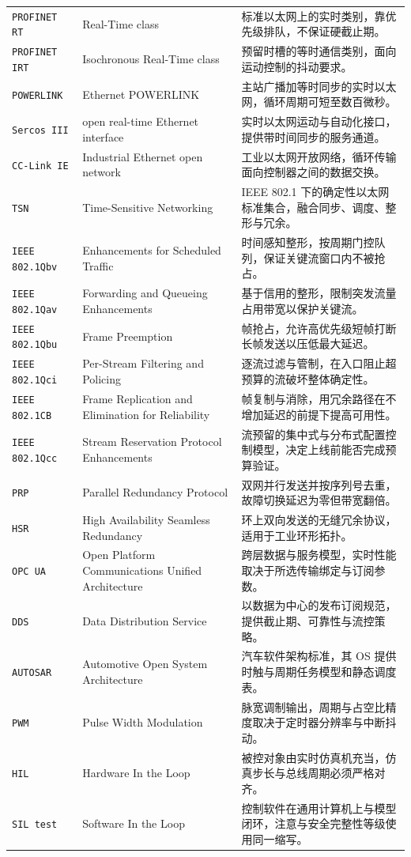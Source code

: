 \documentclass[12pt,a4paper,fontset=fandol]{ctexbook}
\newcommand{\Tp}[1]{\texttt{#1}}
\begin{document}
\begin{longtable}{@{} >{\raggedright\arraybackslash}p{} >{\raggedright\arraybackslash}p{} >{\raggedright\arraybackslash}p{}@{}}
\Tp{PROFINET RT} & Real-Time class & 标准以太网上的实时类别，靠优先级排队，不保证硬截止期。 \\
\Tp{PROFINET IRT} & Isochronous Real-Time class & 预留时槽的等时通信类别，面向运动控制的抖动要求。 \\
\Tp{POWERLINK} & Ethernet POWERLINK & 主站广播加等时同步的实时以太网，循环周期可短至数百微秒。 \\
\Tp{Sercos III} & open real-time Ethernet interface & 实时以太网运动与自动化接口，提供带时间同步的服务通道。 \\
\Tp{CC-Link IE} & Industrial Ethernet open network & 工业以太网开放网络，循环传输面向控制器之间的数据交换。 \\
\Tp{TSN} & Time-Sensitive Networking & IEEE 802.1 下的确定性以太网标准集合，融合同步、调度、整形与冗余。 \\
\Tp{IEEE 802.1Qbv} & Enhancements for Scheduled Traffic & 时间感知整形，按周期门控队列，保证关键流窗口内不被抢占。 \\
\Tp{IEEE 802.1Qav} & Forwarding and Queueing Enhancements & 基于信用的整形，限制突发流量占用带宽以保护关键流。 \\
\Tp{IEEE 802.1Qbu} & Frame Preemption & 帧抢占，允许高优先级短帧打断长帧发送以压低最大延迟。 \\
\Tp{IEEE 802.1Qci} & Per-Stream Filtering and Policing & 逐流过滤与管制，在入口阻止超预算的流破坏整体确定性。 \\
\Tp{IEEE 802.1CB} & Frame Replication and Elimination for Reliability & 帧复制与消除，用冗余路径在不增加延迟的前提下提高可用性。 \\
\Tp{IEEE 802.1Qcc} & Stream Reservation Protocol Enhancements & 流预留的集中式与分布式配置控制模型，决定上线前能否完成预算验证。 \\
\Tp{PRP} & Parallel Redundancy Protocol & 双网并行发送并按序列号去重，故障切换延迟为零但带宽翻倍。 \\
\Tp{HSR} & High Availability Seamless Redundancy & 环上双向发送的无缝冗余协议，适用于工业环形拓扑。 \\
\Tp{OPC UA} & Open Platform Communications Unified Architecture & 跨层数据与服务模型，实时性能取决于所选传输绑定与订阅参数。 \\
\Tp{DDS} & Data Distribution Service & 以数据为中心的发布订阅规范，提供截止期、可靠性与流控策略。 \\
\Tp{AUTOSAR} & Automotive Open System Architecture & 汽车软件架构标准，其 OS 提供时触与周期任务模型和静态调度表。 \\
\Tp{PWM} & Pulse Width Modulation & 脉宽调制输出，周期与占空比精度取决于定时器分辨率与中断抖动。 \\
\Tp{HIL} & Hardware In the Loop & 被控对象由实时仿真机充当，仿真步长与总线周期必须严格对齐。 \\
\Tp{SIL test} & Software In the Loop & 控制软件在通用计算机上与模型闭环，注意与安全完整性等级使用同一缩写。 \\
\end{longtable}
\end{document}
